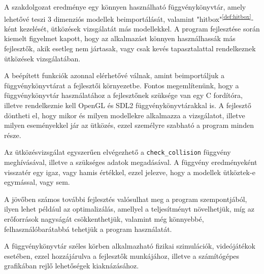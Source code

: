 
A szakdolgozat eredménye egy könnyen használható függvénykönyvtár, amely lehetővé teszi 3 dimenziós modellek beimportálását, valamint "hitbox"\textsuperscript{\ref{def:hitbox}}-ként kezelését, ütközések vizsgálatát más modellekkel. A program fejlesztése során kiemelt figyelmet kapott, hogy az alkalmazást könnyen használhassák más fejlesztők, akik esetleg nem jártasak, vagy csak kevés tapasztalattal rendelkeznek ütközések vizsgálatában.

A beépített funkciók azonnal elérhetővé válnak, amint beimportáljuk a függvénykönyvtárat a fejlesztői környezetbe. Fontos megemlítenünk, hogy a függvénykönyvtár használatához a fejlesztőnek szüksége van egy C fordítóra, illetve rendelkeznie kell OpenGL \cite{OpenGL} és SDL2 \cite{SDL2} függvénykönyvtárakkal is. A fejlesztő döntheti el, hogy mikor és milyen modellekre alkalmazza a vizsgálatot, illetve milyen eseményekkel jár az ütközés, ezzel személyre szabható a program minden része.

Az ütközésvizsgálat egyszerűen elvégezhető a \texttt{check\_collision} függvény meghívásával, illetve a szükséges adatok megadásával. A függvény eredményeként visszatér egy igaz, vagy hamis értékkel, ezzel jelezve, hogy a modellek ütköztek-e egymással, vagy sem.

A jövőben számos további fejlesztés valósulhat meg a program szempontjából, ilyen lehet például az optimalizálás, amellyel a teljesítményt növelhetjük, míg az erőforrások nagyságát csökkenthetjük, valamint még könnyebbé, felhasználóbarátabbá tehetjük a program használatát.

A függvénykönyvtár széles körben alkalmazható fizikai szimulációk, videójátékok esetében, ezzel hozzájárulva a fejlesztők munkájához, illetve a számítógépes grafikában rejlő lehetőségek kiaknázásához.
